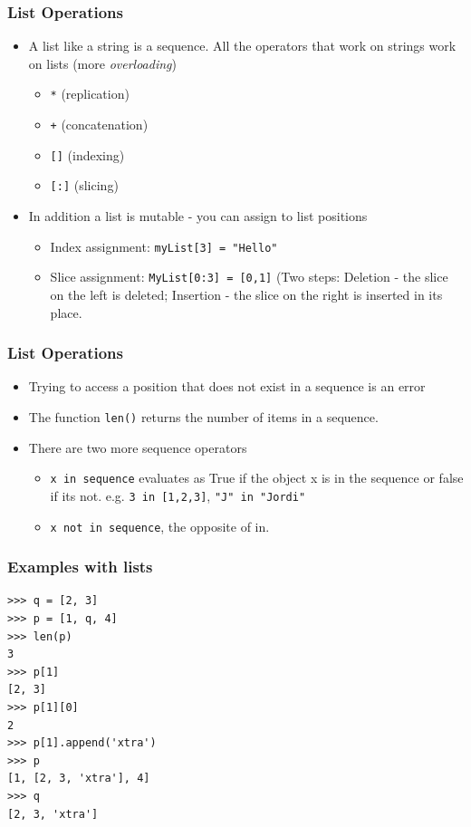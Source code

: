 \documentclass{beamer}
\begin{document}
\begin{frame}
\frametitle{List Operations}
\begin{itemize}
\item A list like a string is a sequence. All the operators that work on strings work on lists (more {\em overloading})
\begin{itemize}
\item \texttt{*} (replication)
\item \texttt{+} (concatenation)
\item \texttt{[]} (indexing)
\item \texttt{[:]} (slicing)
\end{itemize}
\item In addition a list is mutable - you can assign to list positions
\begin{itemize}
\item Index assignment: \texttt{myList[3] = "Hello"} 
\item Slice assignment: \texttt{MyList[0:3] = [0,1]} (Two steps: Deletion - the slice on the left is deleted; Insertion - the slice on the right is inserted in its place.
\end{itemize}
\end{itemize}
\end{frame}

\begin{frame}
\frametitle{List Operations}
\begin{itemize}
\item Trying to access a position that does not exist in a sequence is an error
\item The function \texttt{len()} returns the number of items in a sequence.
\item There are two more sequence operators
\begin{itemize}
\item \texttt{x in sequence} evaluates as True if the object x is in the sequence or false if its not.  e.g. \texttt{3 in [1,2,3]}, \texttt{"J" in "Jordi"}
\item \texttt{x not in sequence},  the opposite of in.
\end{itemize}
\end{itemize}
\end{frame}

\begin{frame}[containsverbatim]
\frametitle{Examples with lists}
\begin{lstlisting}
>>> q = [2, 3]
>>> p = [1, q, 4]
>>> len(p)
3
>>> p[1]
[2, 3]
>>> p[1][0]
2
>>> p[1].append('xtra')
>>> p
[1, [2, 3, 'xtra'], 4]
>>> q
[2, 3, 'xtra']
\end{lstlisting}
\end{frame}
\end{document}
